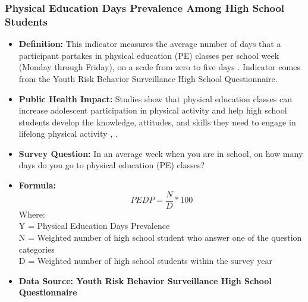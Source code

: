 \documentclass[12pt,letterpaper]{report}
\begin{document}
		\subsubsection{Physical Education Days Prevalence Among High School Students} 
	\begin{itemize}
		\item \textbf{Definition:} This indicator measures the average number of days that a participant partakes in physical education (PE) classes per school week (Monday through Friday), on a scale from zero to five days \cite{YRBS}. Indicator comes from the Youth Risk Behavior Surveillance High School Questionnaire.
		\item \textbf{Public Health Impact:} Studies show that physical education classes can increase adolescent participation in physical activity and help high school students develop the knowledge, attitudes, and skills they need to engage in lifelong physical activity \cite{trudeau2005contribution}, \cite{gordon2000determinants}.
		\item \textbf{Survey Question:} In an average week when you are in school, on how many days do you go to physical education (PE) classes?

		\item \textbf{Formula:} 
			\begin{equation}
				PEDP = \frac{N}{D} * 100
			\end{equation}
Where: \\
			Y = Physical Education Days Prevalence\\
			
			N = Weighted number of high school student who answer one of the question categories \\
			
			D = Weighted number of high school students within the survey year \\			

\item \textbf{Data Source: Youth Risk Behavior Surveillance High School Questionnaire}
	\end{itemize}
\end{document}
